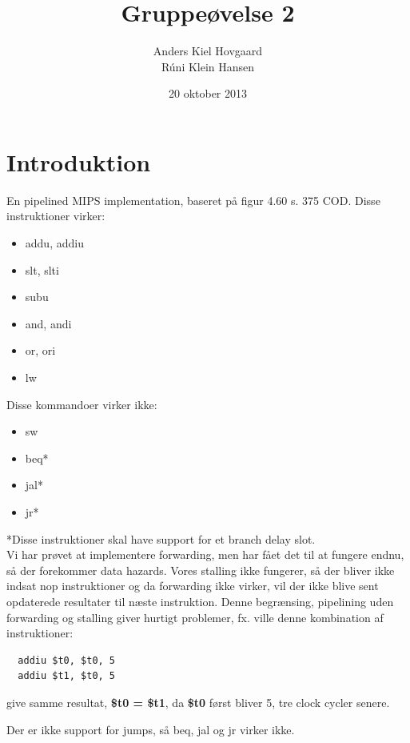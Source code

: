 \documentclass[12pt,a4paper,danish]{article}
\begin{document}
\title{Gruppeøvelse 2}
\author{Anders Kiel Hovgaard\\Rúni Klein Hansen}
\date{20 oktober 2013}
\maketitle

\section{Introduktion}
En pipelined MIPS implementation, baseret på figur 4.60 s. 375 COD.
Disse instruktioner virker:
\begin{itemize}
  \item addu, addiu
  \item slt, slti
  \item subu
  \item and, andi
  \item or, ori
  \item lw
\end{itemize}

Disse kommandoer virker ikke:
\begin{itemize}
  \item sw
  \item beq*
  \item jal*
  \item jr*
\end{itemize}
*Disse instruktioner skal have support for et branch delay slot.\\

Vi har prøvet at implementere forwarding, men har fået det til at fungere endnu, 
så der forekommer data hazards. Vores stalling ikke fungerer, så 
der bliver ikke indsat nop instruktioner og da forwarding ikke virker, vil der ikke 
blive sent opdaterede resultater til næste instruktion. Denne begrænsing, pipelining 
uden forwarding og stalling giver hurtigt problemer, fx. ville denne kombination 
af instruktioner:
\begin{verbatim}
  addiu $t0, $t0, 5
  addiu $t1, $t0, 5
\end{verbatim}
give samme resultat, \textbf{\$t0 = \$t1}, da \textbf{\$t0} først bliver 5, tre 
clock cycler senere. 

Der er ikke support for jumps, så beq, jal og jr virker ikke.
\end{document}
